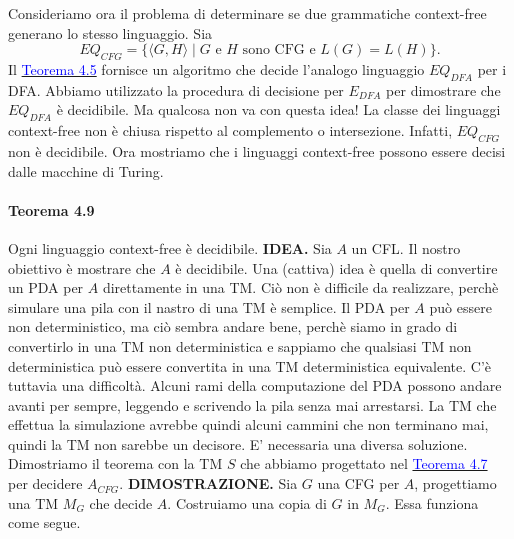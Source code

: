 \documentclass{article}
\begin{document}
Consideriamo ora il problema di determinare se due grammatiche context-free generano lo stesso linguaggio. Sia
$$
EQ_{CFG} = \{\langle G,H \rangle \mid G \text{ e } H \text{ sono CFG e } L(G) = L(H) \}.
$$
Il \hyperref[teorema-4.5]{\textcolor{blue}{Teorema 4.5}} fornisce un algoritmo che decide l'analogo linguaggio $EQ_{DFA}$ per i DFA.
Abbiamo utilizzato la procedura di decisione per $E_{DFA}$ per dimostrare che $EQ_{DFA}$ è decidibile.
Ma qualcosa non va con questa idea! La classe dei linguaggi context-free non è chiusa rispetto al complemento o intersezione.
Infatti, $EQ_{CFG}$ non è decidibile.
Ora mostriamo che i linguaggi context-free possono essere decisi dalle macchine di Turing.

\paragraph{Teorema 4.9}
\label{teorema-4.9}
Ogni linguaggio context-free è decidibile.
\vspace{1em}
\text{}
\newline
\hbox{\textbf{IDEA.}}
Sia $A$ un CFL. Il nostro obiettivo è mostrare che $A$ è decidibile.
Una (cattiva) idea è quella di convertire un PDA per $A$ direttamente in una TM.
Ciò non è difficile da realizzare, perchè simulare una pila con il nastro di una TM è semplice.
Il PDA per $A$ può essere non deterministico, ma ciò sembra andare bene, perchè siamo in grado di convertirlo in una TM non deterministica e sappiamo che qualsiasi TM non deterministica può essere convertita in una TM deterministica equivalente.
C'è tuttavia una difficoltà.
Alcuni rami della computazione del PDA possono andare avanti per sempre, leggendo e scrivendo la pila senza mai arrestarsi.
La TM che effettua la simulazione avrebbe quindi alcuni cammini che non terminano mai, quindi la TM non sarebbe un decisore.
\vspace{1em}
\text{}
\newline
E' necessaria una diversa soluzione.
Dimostriamo il teorema con la TM $S$ che abbiamo progettato nel \hyperref[teorema-4.7]{\textcolor{blue}{Teorema 4.7}} per decidere $A_{CFG}$.
\vspace{1em}
\text{}
\newline
\hbox{\textbf{DIMOSTRAZIONE.}}
Sia $G$ una CFG per $A$, progettiamo una TM $M_G$ che decide $A$.
Costruiamo una copia di $G$ in $M_G$.
Essa funziona come segue.
\end{document}
